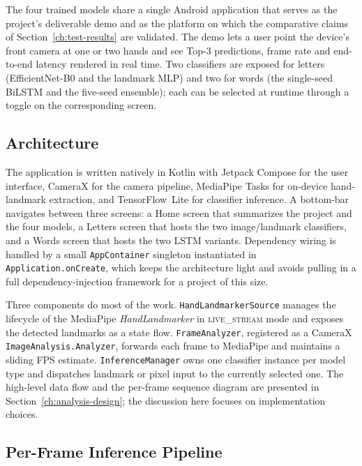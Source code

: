 The four trained models share a single Android application that
serves as the project's deliverable demo and as the platform on
which the comparative claims of Section~\ref{ch:test-results} are
validated. The demo lets a user point the device's front camera at
one or two hands and see Top-3 predictions, frame rate and
end-to-end latency rendered in real time. Two classifiers are
exposed for letters (EfficientNet-B0 and the landmark MLP) and two
for words (the single-seed BiLSTM and the five-seed ensemble); each
can be selected at runtime through a toggle on the corresponding
screen.

\subsection{Architecture}
\label{sec:impl-android-arch}

The application is written natively in Kotlin with Jetpack Compose
for the user interface, CameraX for the camera pipeline, MediaPipe
Tasks for on-device hand-landmark extraction, and TensorFlow~Lite
for classifier inference. A bottom-bar navigates between three
screens: a Home screen that summarizes the project and the four
models, a Letters screen that hosts the two image/landmark
classifiers, and a Words screen that hosts the two LSTM variants.
Dependency wiring is handled by a small \texttt{AppContainer}
singleton instantiated in \texttt{Application.onCreate}, which keeps
the architecture light and avoids pulling in a full
dependency-injection framework for a project of this size.

Three components do most of the work. \texttt{HandLandmarkerSource}
manages the lifecycle of the MediaPipe \textit{HandLandmarker} in
\textsc{live\_stream} mode and exposes the detected landmarks as a
state flow. \texttt{FrameAnalyzer}, registered as a CameraX
\texttt{ImageAnalysis.Analyzer}, forwards each frame to MediaPipe
and maintains a sliding FPS estimate. \texttt{InferenceManager} owns
one classifier instance per model type and dispatches landmark or
pixel input to the currently selected one. The high-level data flow
and the per-frame sequence diagram are presented in
Section~\ref{ch:analysis-design}; the discussion here focuses on
implementation choices.

\subsection{Per-Frame Inference Pipeline}
\label{sec:impl-android-pipeline}

